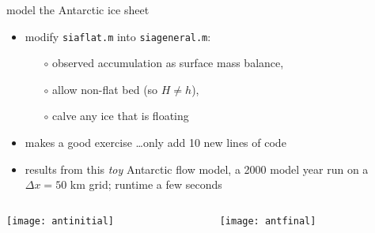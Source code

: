 \begin{frame}{model the Antarctic ice sheet}

\normalsize
\begin{itemize}
\item modify \texttt{siaflat.m} into \texttt{siageneral.m}:
  \begin{itemize}
  \item[$\circ$] observed accumulation as surface mass balance,
  \item[$\circ$] allow non-flat bed (so $H\ne h$),
  \item[$\circ$] calve any ice that is floating
  \end{itemize}
\item makes a good exercise \dots only add 10 new lines of code
\item results from this \emph{toy} Antarctic flow model, a 2000 model year run on a $\Delta x=50$ km grid; runtime a few seconds
\end{itemize}

\bigskip

\begin{columns}
\begin{column}{0.4\textwidth}
\texttt{[image: antinitial]}
\end{column}
\begin{column}{0.55\textwidth}
\texttt{[image: antfinal]}
\end{column}
\end{columns}
\end{frame}
